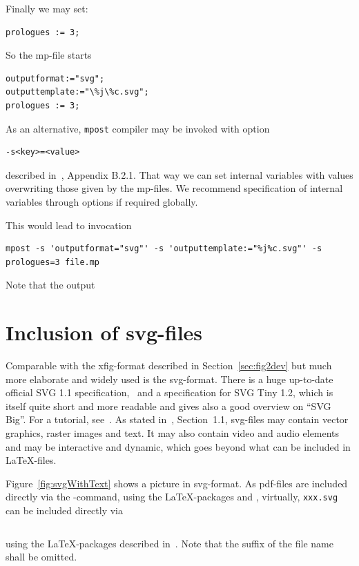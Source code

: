 \documentclass[12pt]{book}
\newcommand{\gls}[1]{#1}
\begin{document}
Finally we may set: 
%
\begin{verbatim}
prologues := 3;
\end{verbatim}

So the mp-file starts 
%
\begin{lstlisting}[language=metapost, basicstyle=\normalsize]
outputformat:="svg";
outputtemplate:="\%j\%c.svg";
prologues := 3;
\end{lstlisting}

As an alternative, \texttt{mpost} compiler may be invoked with option 
%
\begin{verbatim}
-s<key>=<value>
\end{verbatim}
%
described in~\cite{MPost}, Appendix B.2.1. 
That way we can set internal variables with values 
overwriting those given by the mp-files. 
We recommend specification of internal variables through options 
if required globally. 

This would lead to invocation 
%
\begin{Verbatim}[fontsize=\scriptsize]
mpost -s 'outputformat="svg"' -s 'outputtemplate:="%j%c.svg"' -s prologues=3 file.mp
\end{Verbatim}

Note that the output 

\section{Inclusion of svg-files}\label{sec:picSvg}

Comparable with the xfig-format described in Section~\ref{sec:fig2dev} 
but much more elaborate and widely used is the \gls{svg}-format. 
There is a huge up-to-date official SVG 1.1 specification,~\cite{Svg11} 
and a specification for SVG Tiny 1.2, 
\cite{Svg12Tiny} which is itself quite short and more readable 
and gives also a good overview on ``SVG Big''. 
For a tutorial, see~\cite{SvgTut}. 
As stated in~\cite{Svg12Tiny}, Section~1.1, 
svg-files may contain vector graphics, raster images and text. 
It may also contain video and audio elements 
and may be interactive and dynamic, 
which goes beyond what can be included in \LaTeX-files. 

Figure~\ref{fig:svgWithText} shows a picture in \gls{svg}-format. 
As pdf-files are included directly 
via the -command, 
using the \LaTeX-packages  and , 
virtually, 
\texttt{xxx.svg} can be included directly via 
\begin{lstlisting}[language=TeX]
%%
\end{lstlisting}
%
using the \LaTeX-packages  described in~\cite{SvgP}. 
Note that the suffix of the file name shall be omitted. 
\end{document}
